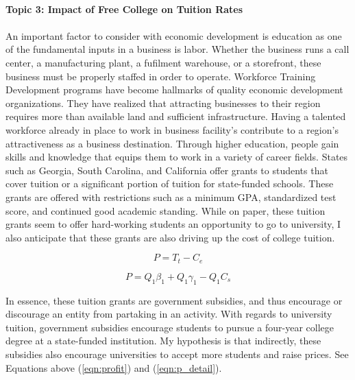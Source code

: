 \documentclass{article}
\begin{document}
    \paragraph*{Topic 3: Impact of Free College on Tuition Rates} 
       \paragraph{}An important factor to consider with economic development is education as one of the fundamental inputs in a business is labor.
    Whether the business runs a call center, a manufacturing plant, a fufilment warehouse, or a storefront, these business must be properly staffed in order to operate.
    Workforce Training Development programs have become hallmarks of quality economic development organizations. 
    They have realized that attracting businesses to their region requires more than available land and sufficient infrastructure. 
    Having a talented workforce already in place to work in business facility's contribute to a region's attractiveness as a business destination.
        Through higher education, people gain skills and knowledge that equips them to work in a variety of career fields. 
    States such as Georgia, South Carolina, and California offer grants to students that cover tuition or a significant portion of tuition for state-funded schools.
    These grants are offered with restrictions such as a minimum GPA, standardized test score, and continued good academic standing.
    While on paper, these tuition grants seem to offer hard-working students an opportunity to go to university, I also anticipate that these grants are also driving up the cost of college tuition.

    \begin{equation} \label{eqn:profit}
        P = T_t - C_e
        \end{equation}

        \begin{equation} \label{eqn:p_detail}
        P = Q_1 \beta_1 + Q_1 \gamma_1 - Q_1 C_s 
    \end{equation}


   In essence, these tuition grants are government subsidies, and thus encourage or discourage an entity from partaking in an activity. 
    With regards to university tuition, government subsidies encourage students to pursue a four-year college degree at a state-funded institution. 
    My hypothesis is that indirectly, these subsidies also encourage universities to accept more students and raise prices.
 See Equations above (\ref{eqn:profit}) and (\ref{eqn:p_detail}).
\end{document}
